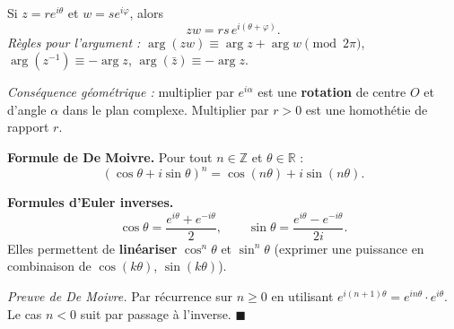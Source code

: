
\begin{tcolorbox}[thmbox]
  Si $z = r e^{i\theta}$ et $w = s e^{i\varphi}$, alors
  \[
    zw = rs\, e^{i(\theta + \varphi)}.
  \]
  \textit{Règles pour l'argument :}
  $\arg(zw) \equiv \arg z + \arg w \pmod{2\pi}$,
  $\arg(z^{-1}) \equiv -\arg z$,
  $\arg(\bar{z}) \equiv -\arg z$.

  \textit{Conséquence géométrique :} multiplier par $e^{i\alpha}$ est une
  \textbf{rotation} de centre $O$ et d'angle $\alpha$ dans le plan complexe.
  Multiplier par $r > 0$ est une homothétie de rapport $r$.
\end{tcolorbox}


\begin{tcolorbox}[thmbox]
  \textbf{Formule de De Moivre.}\enspace%
  Pour tout $n \in \mathbb{Z}$ et $\theta \in \mathbb{R}$ :
  \[
    (\cos\theta + i\sin\theta)^n = \cos(n\theta) + i\sin(n\theta).
  \]

  \medskip
  \textbf{Formules d'Euler inverses.}\enspace%
  \[
    \cos\theta = \frac{e^{i\theta} + e^{-i\theta}}{2}, \qquad
    \sin\theta = \frac{e^{i\theta} - e^{-i\theta}}{2i}.
  \]
  Elles permettent de \textbf{linéariser} $\cos^n\theta$ et $\sin^n\theta$
  (exprimer une puissance en combinaison de $\cos(k\theta)$, $\sin(k\theta)$).
\end{tcolorbox}

\begin{mdframed}[style=proofbar]
  \textit{Preuve de De Moivre.} Par récurrence sur $n \geq 0$ en utilisant
  $e^{i(n+1)\theta} = e^{in\theta} \cdot e^{i\theta}$. Le cas $n < 0$ suit
  par passage à l'inverse. \hfill$\blacksquare$
\end{mdframed}

\decsep{}


